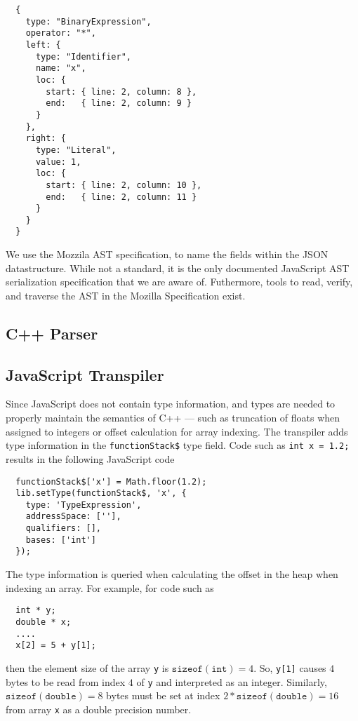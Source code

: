 \documentclass[nocopyrightspace]{sigchi}
\begin{document}
\begin{verbatim}
  {
    type: "BinaryExpression",
    operator: "*",
    left: {
      type: "Identifier",
      name: "x",
      loc: {
        start: { line: 2, column: 8 },
        end:   { line: 2, column: 9 }
      }
    },
    right: {
      type: "Literal",
      value: 1,
      loc: {
        start: { line: 2, column: 10 },
        end:   { line: 2, column: 11 }
      }
    }
  }
\end{verbatim}

We use the Mozzila AST specification, to name the fields within the JSON datastructure.
While not a standard, it is the only documented JavaScript AST serialization specification
that we are aware of. Futhermore, tools to read, verify, and traverse the AST in the
Mozilla Specification exist.



\subsection{C++ Parser}

\subsection{JavaScript Transpiler}


Since JavaScript does not contain type information, and types are needed to
properly maintain the semantics of C++ --- such as truncation of floats when
assigned to integers or offset calculation for array indexing. The transpiler
adds type information in the {\tt functionStack\$} type field. Code such as
{\tt int x = 1.2;} results in the following JavaScript code

\begin{verbatim}
  functionStack$['x'] = Math.floor(1.2);
  lib.setType(functionStack$, 'x', {
    type: 'TypeExpression',
    addressSpace: [''],
    qualifiers: [],
    bases: ['int']
  });
\end{verbatim}

The type information is queried when calculating the offset in the heap when
indexing an array. For example, for code such as

\begin{verbatim}
  int * y;
  double * x;
  ....
  x[2] = 5 + y[1];
\end{verbatim}

then the element size of the array {\tt y} is $\mathtt{sizeof(int)} = 4$.
So, {\tt y[1]} causes $4$ bytes to be read from index $4$ of {\tt y} and
interpreted as an integer. Similarly, $\mathtt{sizeof(double)} = 8$ bytes
must be set at index $2 * \mathtt{sizeof(double)} = 16$ from array {\tt x}
as a double precision number.
\end{document}
